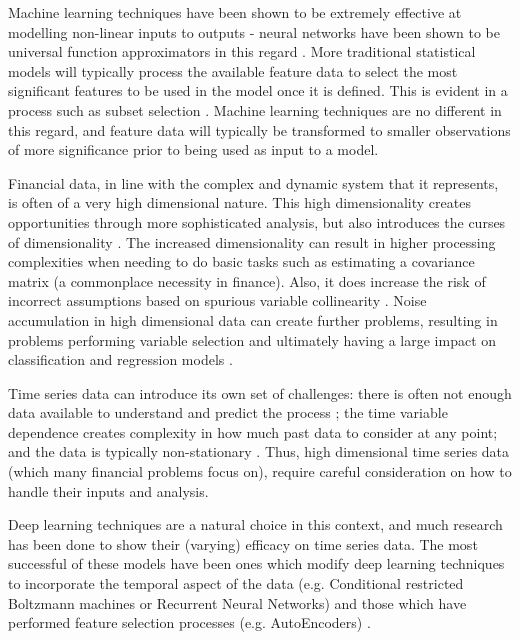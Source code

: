 \documentclass[a4paper,11pt,oneside]{article}
\theoremstyle{plain}
\theoremstyle{definition}
\begin{document}
	Machine learning techniques have been shown to be extremely effective at modelling non-linear inputs 
	to outputs - neural networks have been shown to be universal function approximators in this regard \citep{Hornik}. 
	More traditional statistical models will typically process the available feature data to select the most significant 
	features to be used in the model once it is defined. This is evident in a process such as subset selection \citep{Schaefer}. 
	Machine learning techniques are no different in this regard, and feature data will typically be transformed to smaller 
	observations of more significance prior to being used as input to a model.
	\hfill \break 
	
	Financial data, in line with the complex and dynamic system that it represents, is often of a very high dimensional 
	nature. This high dimensionality creates opportunities through more sophisticated analysis, but also introduces the curses of
	dimensionality \citep{Donoho}. The increased dimensionality can result in higher processing complexities when needing to 
	do basic tasks such as estimating a covariance matrix (a commonplace necessity in finance). Also, it does increase 
	the risk of incorrect assumptions based on spurious variable collinearity \citep{Fan1}. Noise accumulation in high 
	dimensional data can create further problems, resulting in problems performing variable selection and ultimately 
	having a large impact on classification and regression models \citep{Fan2}.
	\hfill \break 
	
	Time series data can introduce its own set of challenges: there is often not enough data available to understand 
	and predict the process \citep{Fama}; the time variable dependence creates complexity in how much past 
	data to consider at any point; and the data is typically non-stationary \citep{Langkvist}. Thus, high dimensional time 
	series data (which many financial problems focus on), require careful consideration on how to handle their inputs 
	and analysis.
	\hfill \break 
	
	Deep learning techniques are a natural choice in this context, and much research has been done to show their 
	(varying) efficacy on time series data. The most successful of these models have been ones which modify deep 
	learning techniques to incorporate the temporal aspect of the data (e.g. Conditional restricted Boltzmann 
	machines or Recurrent Neural Networks) and those which have performed feature selection
	processes (e.g. AutoEncoders) \citep{Langkvist}. 
	\hfill \break 
	
\end{document}
